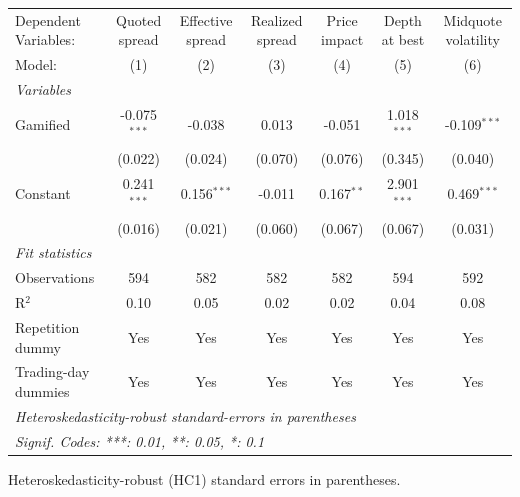 \begingroup
\centering
\begin{tabular}{lcccccc}
   \tabularnewline \midrule \midrule
   Dependent Variables: & Quoted spread  & Effective spread & Realized spread & Price impact & Depth at best & Midquote volatility\\  
   Model:               & (1)            & (2)              & (3)             & (4)          & (5)           & (6)\\  
   \midrule
   \emph{Variables}\\
   Gamified             & -0.075$^{***}$ & -0.038           & 0.013           & -0.051       & 1.018$^{***}$ & -0.109$^{***}$\\   
                        & (0.022)        & (0.024)          & (0.070)         & (0.076)      & (0.345)       & (0.040)\\   
   Constant             & 0.241$^{***}$  & 0.156$^{***}$    & -0.011          & 0.167$^{**}$ & 2.901$^{***}$ & 0.469$^{***}$\\   
                        & (0.016)        & (0.021)          & (0.060)         & (0.067)      & (0.067)       & (0.031)\\   
   \midrule
   \emph{Fit statistics}\\
   Observations         & 594            & 582              & 582             & 582          & 594           & 592\\  
   R$^2$                & 0.10           & 0.05             & 0.02            & 0.02         & 0.04          & 0.08\\  
   Repetition dummy     & Yes            & Yes              & Yes             & Yes          & Yes           & Yes\\  
   Trading-day dummies  & Yes            & Yes              & Yes             & Yes          & Yes           & Yes\\  
   \midrule \midrule
   \multicolumn{7}{l}{\emph{Heteroskedasticity-robust standard-errors in parentheses}}\\
   \multicolumn{7}{l}{\emph{Signif. Codes: ***: 0.01, **: 0.05, *: 0.1}}\\
\end{tabular}
 
\par \raggedright 
Heteroskedasticity-robust (HC1) standard errors in parentheses.
\par\endgroup
